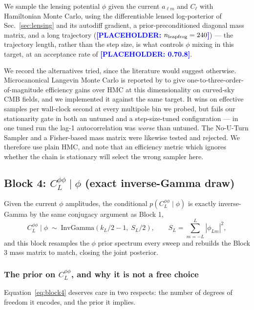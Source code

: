 \documentclass[twocolumn,superscriptaddress,aps,prl,floatfix]{revtex4-2}
\newcommand{\alm}{a_{\ell m}}
\newcommand{\cl}{C_\ell}
\newcommand{\clpp}{C_L^{\phi\phi}}
\newcommand{\placeholder}[1]{\textcolor{blue}{\textbf{[PLACEHOLDER: #1]}}}
\begin{document}
We sample the lensing potential $\phi$ given the current $\alm$ and $\cl$ with
Hamiltonian Monte Carlo, using the differentiable lensed log-posterior of
Sec.~\ref{sec:lensing} and its autodiff gradient, a prior-preconditioned
diagonal mass matrix, and a long trajectory
(\placeholder{$n_{\rm leapfrog} = 240$}) --- the trajectory length, rather than
the step size, is what controls $\phi$ mixing in this target, at an acceptance
rate of \placeholder{0.7\text{--}0.8}.

We record the alternatives tried, since the literature would suggest otherwise.
Microcanonical Langevin Monte Carlo \citep{Robnik:2022} is reported by
\citet{Bayer:2023,Flinch} to give one-to-three-order-of-magnitude efficiency
gains over HMC at this dimensionality on curved-sky CMB fields, and we
implemented it against the same target. It wins on effective samples per
wall-clock second at every multipole bin we probed, but fails our stationarity
gate in both an untuned and a step-size-tuned configuration --- in one tuned run
the lag-1 autocorrelation was \emph{worse} than untuned. The No-U-Turn Sampler
and a Fisher-based mass matrix were likewise tested and rejected. We therefore
use plain HMC, and note that an efficiency metric which ignores whether the
chain is stationary will select the wrong sampler here.

\subsection{Block 4: $\clpp \mid \phi$ (exact inverse-Gamma draw)}
\label{sec:block4}

Given the current $\phi$ amplitudes, the conditional $p(\clpp \mid \phi)$ is
exactly inverse-Gamma by the same conjugacy argument as Block 1,
\begin{equation}
  \clpp \mid \phi \;\sim\; \mathrm{InvGamma}\!\left(k_L/2 - 1,\; S_L/2\right),
  \qquad S_L = \sum_{m=-L}^{L} |\phi_{Lm}|^2 ,
  \label{eq:block4}
\end{equation}
and this block resamples the $\phi$ prior spectrum every sweep and rebuilds the
Block 3 mass matrix to match, closing the joint posterior.

\subsubsection*{The prior on \texorpdfstring{$\clpp$}{ClPhiPhi}, and why it is
not a free choice}
\label{sec:clpp-prior}

Equation~\eqref{eq:block4} deserves care in two respects: the number of degrees
of freedom it encodes, and the prior it implies.
\end{document}
